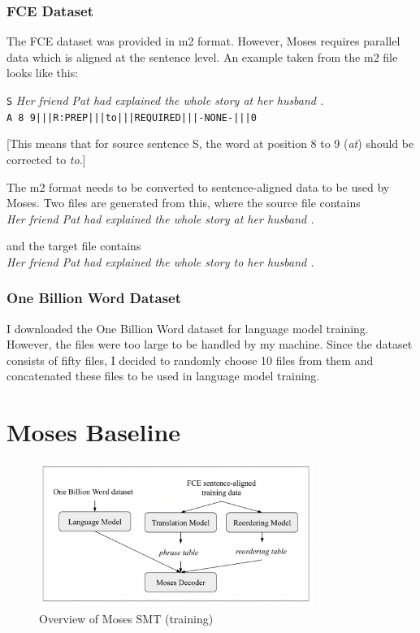 \documentclass[12pt,a4paper,twoside,openright]{report}
\begin{document}
\subsubsection{FCE Dataset}

The FCE dataset was provided in m2 format. However, Moses requires parallel data which is aligned at the sentence level. An example taken from the m2 file looks like this:

\texttt{S} \textit{Her friend Pat had explained the whole story at her husband .}\\
\texttt{A 8 9|||R:PREP|||to|||REQUIRED|||-NONE-|||0}

[This means that for source sentence S, the word at position 8 to 9 (\textit{at}) should be corrected to \textit{to}.]

The m2 format needs to be converted to sentence-aligned data to be used by Moses. Two files are generated from this, where the source file contains\\
\textit{Her friend Pat had explained the whole story at her husband .}

and the target file contains\\
\textit{Her friend Pat had explained the whole story to her husband .}

\subsubsection{One Billion Word Dataset}

I downloaded the One Billion Word dataset for language model training. However, the files were too large to be handled by my machine. Since the dataset consists of fifty files, I decided to randomly choose 10 files from them and concatenated these files to be used in language model training. 


\section{Moses Baseline} \label{moses_baseline}

\begin{figure}[ht]
\centering
\includegraphics[width=0.8\textwidth]{images/moses_pipeline.png}
\caption{Overview of Moses SMT (training)}
\label{fig:moses_pipeline}
\end{figure}
\end{document}
